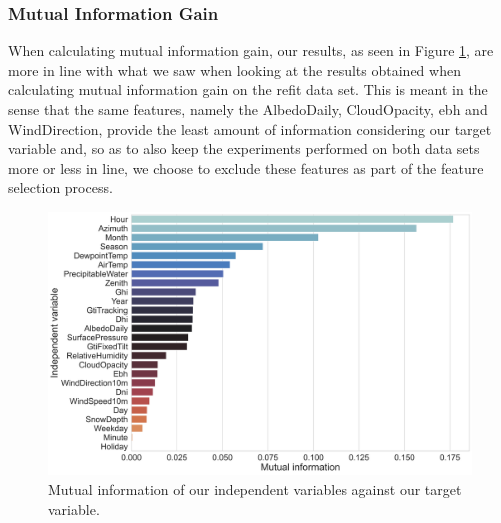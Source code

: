\subsubsection{Mutual Information Gain}
\label{subsubsec:Exploratory-Data-Analysis:UCID:Causality-and-Correlation:Mutual-Information-Gain}
When calculating mutual information gain, our results, as seen in Figure \ref{fig:UCID-Mutual-Information-Gain}, are more in line with what we saw when looking at the results obtained when calculating mutual information gain on the \gls{refit} data set. This is meant in the sense that the same features, namely the AlbedoDaily, CloudOpacity, \gls{ebh} and WindDirection, provide the least amount of information considering our target variable and, so as to also keep the experiments performed on both data sets more or less in line, we choose to exclude these features as part of the feature selection process.

\begin{figure}[H]
    \centering
    \includegraphics[width=\textwidth]{Images/Chapter 5/UCID/UCID-Mutual-Information.png}
    \caption{Mutual information of our independent variables against our target variable.}
    \label{fig:UCID-Mutual-Information-Gain}
\end{figure}